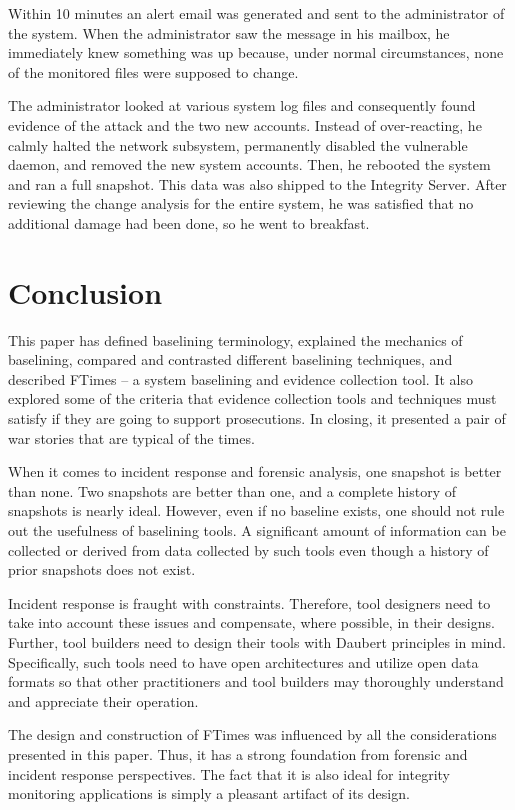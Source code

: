 \documentclass[10pt]{article}
\begin{document}
Within 10 minutes an alert email was generated and sent to the
administrator of the system.  When the administrator saw the message
in his mailbox, he immediately knew something was up because, under
normal circumstances, none of the monitored files were supposed to
change.

The administrator looked at various system log files and consequently
found evidence of the attack and the two new accounts.  Instead of
over-reacting, he calmly halted the network subsystem, permanently
disabled the vulnerable daemon, and removed the new system accounts.
Then, he rebooted the system and ran a full snapshot.  This data was
also shipped to the Integrity Server.  After reviewing the change
analysis for the entire system, he was satisfied that no additional
damage had been done, so he went to breakfast.

\section{Conclusion}

This paper has defined baselining terminology, explained the mechanics
of baselining, compared and contrasted different baselining
techniques, and described FTimes -- a system baselining and evidence
collection tool.  It also explored some of the criteria that evidence
collection tools and techniques must satisfy if they are going to
support prosecutions.  In closing, it presented a pair of war stories
that are typical of the times.

When it comes to incident response and forensic analysis, one snapshot
is better than none.  Two snapshots are better than one, and a
complete history of snapshots is nearly ideal.  However, even if no
baseline exists, one should not rule out the usefulness of baselining
tools.  A significant amount of information can be collected or
derived from data collected by such tools even though a history of
prior snapshots does not exist.

Incident response is fraught with constraints.  Therefore, tool
designers need to take into account these issues and compensate, where
possible, in their designs.  Further, tool builders need to design
their tools with Daubert principles in mind.  Specifically, such tools
need to have open architectures and utilize open data formats so that
other practitioners and tool builders may thoroughly understand and
appreciate their operation.

The design and construction of FTimes was influenced by all the
considerations presented in this paper.  Thus, it has a strong
foundation from forensic and incident response perspectives.  The fact
that it is also ideal for integrity monitoring applications is simply
a pleasant artifact of its design.
\end{document}
